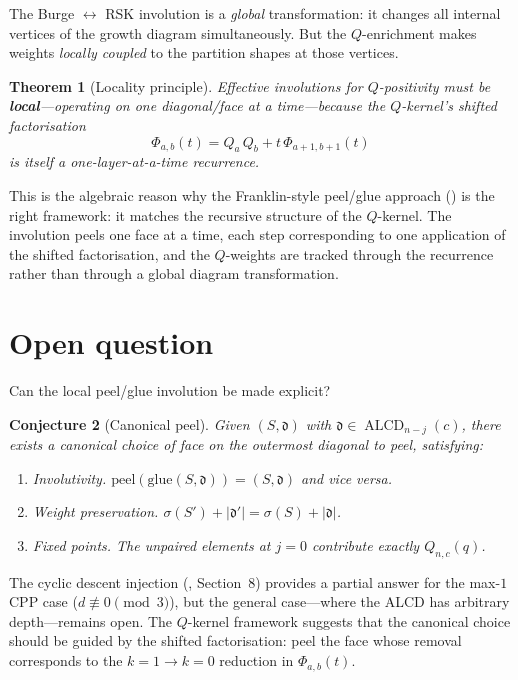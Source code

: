 \documentclass[11pt]{article}
\newcommand{\ALCD}{\operatorname{ALCD}}
\theoremstyle{plain}
\newtheorem{theorem}{Theorem}
\newtheorem{conjecture}[theorem]{Conjecture}
\theoremstyle{definition}
\begin{document}
The Burge $\leftrightarrow$ RSK involution is a \emph{global}
transformation: it changes all internal vertices of the growth
diagram simultaneously.  But the $Q$-enrichment makes weights
\emph{locally coupled} to the partition shapes at those vertices.

\begin{theorem}[Locality principle]
\label{thm:locality}
Effective involutions for $Q$-positivity must be
\textbf{local}---operating on one diagonal/face at a time---because
the $Q$-kernel's shifted factorisation
\[
  \Phi_{a,b}(t) = Q_a\, Q_b + t\, \Phi_{a+1,b+1}(t)
\]
is itself a one-layer-at-a-time recurrence.
\end{theorem}

This is the algebraic reason why the Franklin-style peel/glue
approach (\cite{FIRST_ATTEMPT}) is the right framework: it matches
the recursive structure of the $Q$-kernel.  The involution peels
one face at a time, each step corresponding to one application of
the shifted factorisation, and the $Q$-weights are tracked through
the recurrence rather than through a global diagram transformation.


\section{Open question}
\label{sec:open}

Can the local peel/glue involution be made explicit?

\begin{conjecture}[Canonical peel]
\label{conj:peel}
Given $(S, \mathfrak{d})$ with $\mathfrak{d} \in
\ALCD_{n-j}(c)$, there exists a canonical choice of face on the
outermost diagonal to peel, satisfying:
\begin{enumerate}
  \item \emph{Involutivity.}\;
    $\mathrm{peel}(\mathrm{glue}(S, \mathfrak{d}))
    = (S, \mathfrak{d})$ and vice versa.
  \item \emph{Weight preservation.}\;
    $\sigma(S') + |\mathfrak{d}'|
    = \sigma(S) + |\mathfrak{d}|$.
  \item \emph{Fixed points.}\;
    The unpaired elements at $j = 0$ contribute exactly
    $Q_{n,c}(q)$.
\end{enumerate}
\end{conjecture}

The cyclic descent injection (\cite{NOTES}, Section~8) provides a
partial answer for the max-$1$ CPP case ($d \not\equiv 0
\pmod{3}$), but the general case---where the ALCD has arbitrary
depth---remains open.  The $Q$-kernel framework suggests that the
canonical choice should be guided by the shifted factorisation:
peel the face whose removal corresponds to the $k = 1 \to k = 0$
reduction in $\Phi_{a,b}(t)$.
\end{document}
